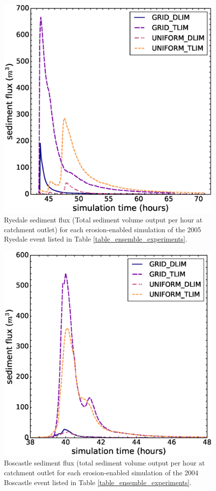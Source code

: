 \begin{figure}[t]
\includegraphics[width=14cm]{chp06_figures_scripts/figure_ryedale_sedigraph_ensemble.eps}
\caption{Ryedale sediment flux (Total sediment volume output per hour at catchment outlet) for each erosion-enabled simulation of the 2005 Ryedale event listed in Table \ref{table_ensemble_experiments}.}
\label{fig_ryedale_sedigraph_ensemble}
\end{figure}

\begin{figure}[t]
\includegraphics[width=14cm]{chp06_figures_scripts/figure_boscastle_sedigraph_ensemble.eps}
\caption{Boscastle sediment flux (total sediment volume output per hour at catchment outlet for each erosion-enabled simulation of the 2004 Boscastle event listed in Table \ref{table_ensemble_experiments}.}
\label{fig_boscastle_sedigraph_ensemble}
\end{figure}

